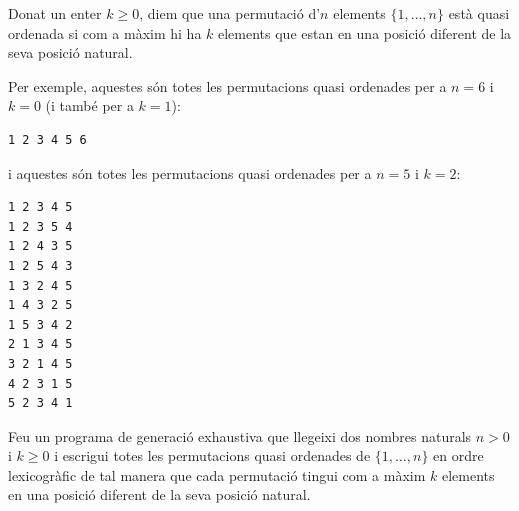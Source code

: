

\Statement

Donat un enter $k\geq 0$, diem que una permutació d'$n$ elements 
$\{1,\dots,n\}$ està quasi ordenada si com a màxim hi ha $k$ elements
que estan en una posició diferent de la seva posició natural.
\medskip

Per exemple, aquestes són totes les permutacions quasi ordenades per a $n=6$
i $k=0$ (i també per a $k=1$):

\begin{verbatim}
1 2 3 4 5 6
\end{verbatim}

i aquestes són totes les permutacions quasi ordenades per a $n=5$ i $k=2$:

\begin{verbatim}
1 2 3 4 5
1 2 3 5 4
1 2 4 3 5
1 2 5 4 3
1 3 2 4 5
1 4 3 2 5
1 5 3 4 2
2 1 3 4 5
3 2 1 4 5
4 2 3 1 5
5 2 3 4 1
\end{verbatim}

\medskip

Feu un programa de generació exhaustiva que llegeixi dos nombres naturals
$n > 0$ i $k\geq 0$ i escrigui totes les permutacions quasi ordenades 
de $\{1,\dots,n\}$ en ordre lexicogràfic de tal manera que cada permutació
tingui com a màxim $k$ elements en una posició diferent de la seva posició 
natural.

\Sample

